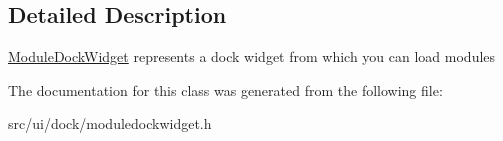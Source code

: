 \subsection{Detailed Description}
\hyperlink{classUi_1_1ModuleDockWidget}{ModuleDockWidget} represents a dock widget from which you can load modules 

The documentation for this class was generated from the following file:\begin{DoxyCompactItemize}
\item 
src/ui/dock/moduledockwidget.h\end{DoxyCompactItemize}
